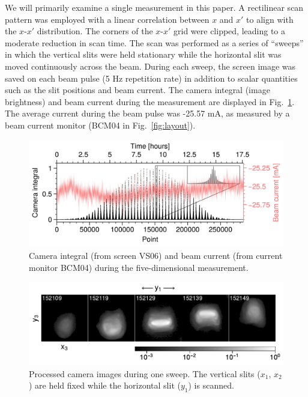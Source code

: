 \documentclass[%
 reprint,
nofootinbib,
 amsmath,amssymb,
 aps,
prstab,
]{revtex4-2}
\begin{document}
We will primarily examine a single measurement in this paper. A rectilinear scan pattern was employed with a linear correlation between $x$ and $x'$ to align with the $x$-$x'$ distribution. The corners of the $x$-$x'$ grid were clipped, leading to a moderate reduction in scan time. The scan was performed as a series of ``sweeps'' in which the vertical slits were held stationary while the horizontal slit was moved continuously across the beam. During each sweep, the screen image was saved on each beam pulse (5 Hz repetition rate) in addition to scalar quantities such as the slit positions and beam current. The camera integral (image brightness) and beam current during the measurement are displayed in Fig.~\ref{fig:scan_a}. The average current during the beam pulse was -25.57 mA, as measured by a beam current monitor (BCM04 in Fig.~\ref{fig:layout}).
%
\begin{figure}
    \centering
    \includegraphics[width=\columnwidth]{fig_bcm.png}
    \caption{Camera integral (from screen VS06) and beam current (from current monitor BCM04) during the five-dimensional measurement.}
    \label{fig:scan_a}
\end{figure}
%
%
\begin{figure}
    \centering
    \includegraphics[width=\columnwidth]{fig_sweep.pdf}
    \caption{Processed camera images during one sweep. The vertical slits ($x_1$, $x_2$) are held fixed while the horizontal slit ($y_1$) is scanned.}
    \label{fig:scan_b}
\end{figure}
%
\end{document}
